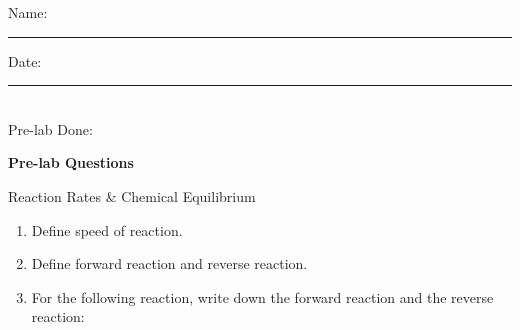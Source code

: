 \documentclass[main.tex]{subfiles}
\begin{document}
\newpage
\setdoublesep{0.35700 em}  %
\setatomsep{1.78500 em}    %
\setbondoffset{0.18265 em} %
\newcommand{\bondwidth}{0.06642 em} %
\setbondstyle{line width = \bondwidth}

 





\begin{multicols}{2}
\begin{tcolorbox}[enhanced jigsaw,breakable,size=title,
colback=mybrown!05,colframe=black,fonttitle=\bfseries,
title=STUDENT INFO,pad at break=1mm, break at=15cm/0pt ]
\vspace{0.2cm}
\noindent Name: \rule{5cm}{0.4pt}Date:\rule{1cm}{0.4pt}\\
Pre-lab Done: \quad
\end{tcolorbox}
\end{multicols}
\hfill
\vspace{0.2cm}
\begin{center}
{\large \bfseries 
Pre-lab Questions 
\par
\Huge
Reaction Rates \&  Chemical Equilibrium
\\[5pt] \par}
\vspace{0.2cm}
\end{center}
\par
\noindent
\uline{  \hfill \normalsize \hfill       }

\begin{enumerate}
\item Define speed of reaction.
\vspace{3cm}

\item Define forward reaction and reverse reaction.
\vspace{3cm}

\item For the following reaction, write down the forward reaction and the reverse reaction:
\begin{center}\end{center}
\vspace{3cm}

%




\end{enumerate}
\end{document}
